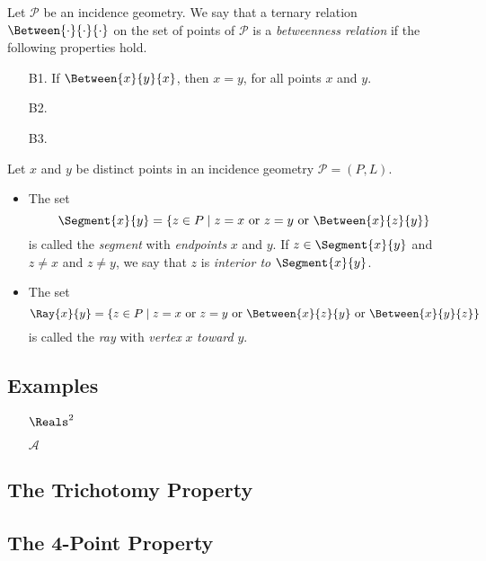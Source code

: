 \documentclass{article}
\begin{document}

\begin{dfn}[Betweenness]
Let $\mathcal{P}$ be an incidence geometry. We say that a ternary relation $\Between{\cdot}{\cdot}{\cdot}$ on the set of points of $\mathcal{P}$ is a \emph{betweenness relation} if the following properties hold.
\begin{itemize}
\item[B1.] If $\Between{x}{y}{x}$, then $x = y$, for all points $x$ and $y$.
\item[B2.] 
\item[B3.] 
\end{itemize}
\end{dfn}

\begin{dfn}
Let $x$ and $y$ be distinct points in an incidence geometry $\mathcal{P} = (P,L)$.
\begin{itemize}
\item The set \[ \Segment{x}{y} = \{ z \in P \mid z = x\ \mathrm{or}\ z = y\ \mathrm{or}\ \Between{x}{z}{y} \} \] is called the \emph{segment} with \emph{endpoints} $x$ and $y$. If $z \in \Segment{x}{y}$ and $z \neq x$ and $z \neq y$, we say that $z$ is \emph{interior to} $\Segment{x}{y}$.
\item The set \[ \Ray{x}{y} = \{ z \in P \mid z = x\ \mathrm{or}\ z = y\ \mathrm{or}\ \Between{x}{z}{y}\ \mathrm{or}\ \Between{x}{y}{z} \} \] is called the \emph{ray} with \emph{vertex} $x$ \emph{toward} $y$.
\end{itemize}
\end{dfn}



\subsection*{Examples}

\begin{itemize}
\item[$\Reals^2$]

\item[$\mathcal{A}$] 
\end{itemize}



\subsection*{The Trichotomy Property}



\subsection*{The 4-Point Property}
\end{document}
